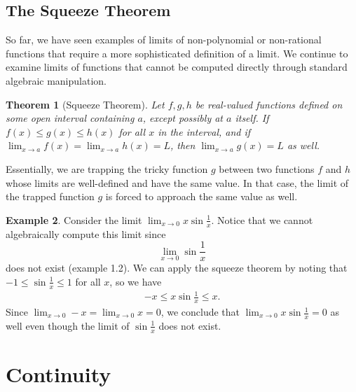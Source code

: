 \documentclass[11pt,oneside,reqno]{amsart}
\numberwithin{equation}{section}
\newtheorem{theorem}{Theorem}[section]
\theoremstyle{definition}
\newtheorem{example}[theorem]{Example}
\theoremstyle{remark}
\begin{document}
\subsection{The Squeeze Theorem} So far, we have seen examples of limits of non-polynomial or non-rational functions that require a more sophisticated definition of a limit. 
We continue to examine limits of functions that cannot be computed directly through standard algebraic manipulation. 
\begin{theorem}[Squeeze Theorem]
    Let $f,g,h$ be real-valued functions defined on some open interval containing $a$, except possibly at $a$ itself. If $f(x) \leq g(x) \leq h(x)$ for all $x$ in the interval, and if $\lim_{x\to a} f(x) = \lim_{x\to a} h(x) = L$, then $\lim_{x\to a} g(x) = L$ as well.
\end{theorem}
Essentially, we are trapping the tricky function $g$ between two functions $f$ and $h$ whose limits are well-defined and have the same value. In that case, the limit of 
the trapped function $g$ is forced to approach the same value as well.

\begin{example}\label{example:sinesqueeze}
    Consider the limit $\lim_{x\to0} x \sin\frac{1}{x}$. Notice that we cannot algebraically compute this limit since \[\lim_{x\to0}\sin\frac{1}{x}\] 
    does not exist (example 1.2). We can apply the squeeze theorem by noting that $-1 \leq \sin\frac{1}{x} \leq 1$ for all $x$, so we have
\begin{align*}
    -x \leq x \sin\frac{1}{x} \leq x.
\end{align*}
Since $\lim_{x\to0} -x = \lim_{x\to0} x = 0$, we conclude that $\lim_{x\to0} x \sin\frac{1}{x} = 0$ as well even though the limit of $\sin\frac{1}{x}$ does not exist.  
\end{example}

\section{Continuity}
\end{document}
